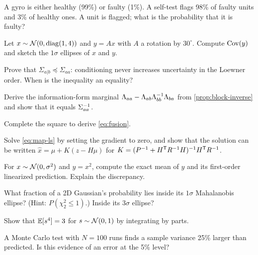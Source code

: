 \begin{exercises}
  \item A gyro is either healthy (99\%) or faulty (1\%). A self-test flags 98\% of faulty units and 3\% of healthy ones. A unit is flagged; what is
        the probability that it is faulty?
  \item Let $x \sim \mathcal{N}(0, \operatorname{diag}(1, 4))$ and $y = Ax$ with $A$ a rotation by $30^\circ$. Compute $\operatorname{Cov}(y)$ and sketch the $1\sigma$ ellipses of $x$ and $y$.
  \item Prove that $\Sigma_{a|b} \preceq \Sigma_{aa}$: conditioning never increases uncertainty in the Loewner order. When is the inequality an equality?
  \item Derive the information-form marginal $\Lambda_{aa} - \Lambda_{ab}\Lambda_{bb}^{-1}\Lambda_{ba}$ from \cref{prop:block-inverse} and show that it equals $\Sigma_{aa}^{-1}$.
  \item Complete the square to derive \eqref{eq:fusion}.
  \item Solve \eqref{eq:map-ls} by setting the gradient to zero, and show that the solution can be written $\hat x = \mu + K(z - H\mu)$ for
        $K = (P^{-1} + H^{\mathsf{T}} R^{-1} H)^{-1} H^{\mathsf{T}} R^{-1}$.
  \item For $x \sim \mathcal{N}(0, \sigma^2)$ and $y = x^2$, compute the exact mean of $y$ and its first-order linearized prediction. Explain the discrepancy.
  \item What fraction of a 2D Gaussian's probability lies inside its $1\sigma$ Mahalanobis ellipse? (Hint: $P(\chi^2_2 \le 1)$.) Inside its $3\sigma$ ellipse?
  \item Show that $\mathbb{E}[s^4] = 3$ for $s \sim \mathcal{N}(0, 1)$ by integrating by parts.
  \item A Monte Carlo test with $N = 100$ runs finds a sample variance 25\% larger than predicted. Is this evidence of an error at the 5\% level?
\end{exercises}

